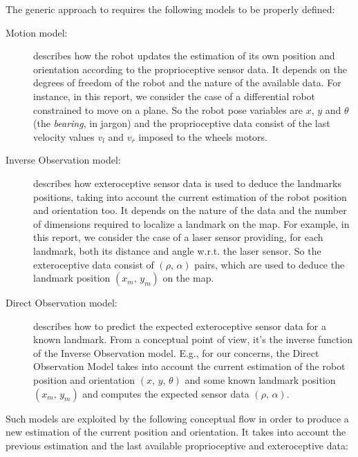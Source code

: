 The generic approach to \SLAM{} requires the following models to be properly defined: 
\begin{description}
	\item[Motion model:] describes how the robot updates the estimation of its own position and orientation according to the proprioceptive sensor data. 
	It depends on the degrees of freedom of the robot and the nature of the available data. 
	For instance, in this report, we consider the case of a differential robot constrained to move on a plane. 
	So the robot pose variables are $x$, $y$ and $\theta$ (the \emph{bearing}, in jargon) and the proprioceptive data consist of the last velocity values $v_l$ and $v_r$ imposed to the wheels motors.

	\item[Inverse Observation model:] describes how exteroceptive sensor data is used to deduce the landmarks positions, taking into account the current estimation of the robot position and orientation too.
	It depends on the nature of the data and the number of dimensions required to localize a landmark on the map.
	For example, in this report, we consider the case of a laser sensor providing, for each landmark, both its distance and angle w.r.t. the laser sensor.
	So the exteroceptive data consist of $(\rho,\, \alpha)$ pairs, which are used to deduce the landmark position $(x_m,\, y_m)$ on the map.
	
	\item[Direct Observation model:] describes how to predict the expected exteroceptive sensor data for a known landmark.
	From a conceptual point of view, it's the inverse function of the Inverse Observation model. 
	E.g., for our concerns, the Direct Observation Model takes into account the current estimation of the robot position and orientation $(x,\, y,\, \theta)$ and some known landmark position $(x_m,\, y_m)$ and computes the expected sensor data $(\rho,\, \alpha)$.
\end{description}
Such models are exploited by the following conceptual flow in order to produce a new estimation of the current position and orientation. It takes into account the previous estimation and the last available proprioceptive and exteroceptive data:
